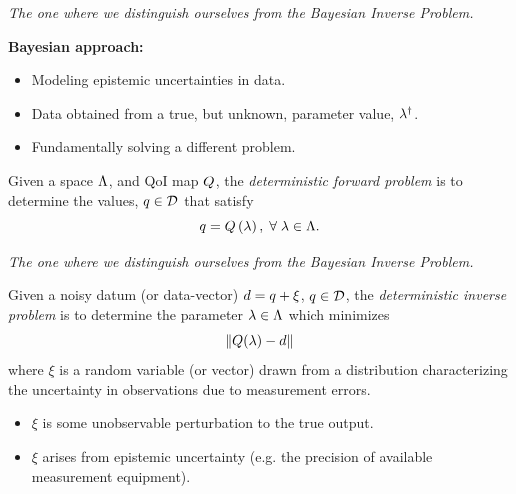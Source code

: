\begin{frame}[t]{\it The one where we distinguish ourselves from the Bayesian Inverse Problem.}

{\bf Bayesian approach:}

\medskip
\begin{itemize}
	\item Modeling epistemic uncertainties in data.

	\bigskip
	\item Data obtained from a true, but unknown, parameter value, $\lambda^\dagger$.

	\bigskip
	\item Fundamentally solving a different problem.
\end{itemize}

\bigskip
\begin{defn}
  Given a space ${\Lambda}$, and QoI map $Q$, the \emph{deterministic forward problem} is to determine the values, $q \in \mathcal{D}$ that satisfy
  \begin{equation}
    q = Q\left ( \lambda \right ), \; \forall \; \lambda \in {\Lambda}.
  \end{equation}
\end{defn}


\end{frame}


\begin{frame}[t]{\it The one where we distinguish ourselves from the Bayesian Inverse Problem.}
\begin{defn}
  Given a noisy datum (or data-vector) $d = q + \xi$, $q \in \mathcal{D}$, the \emph{deterministic inverse problem} is to determine the parameter $\lambda \in {\Lambda}$ which minimizes
  \begin{equation}
    \left\Vert Q(\lambda) - d\right\Vert
  \end{equation}
  where $\xi$ is a random variable (or vector) drawn from a distribution characterizing the uncertainty in observations due to measurement errors.
\end{defn}

\begin{itemize}
	\item $\xi$ is some unobservable perturbation to the true output.
	\item $\xi$ arises from epistemic uncertainty (e.g. the precision of available measurement equipment).
\end{itemize}

\end{frame}


